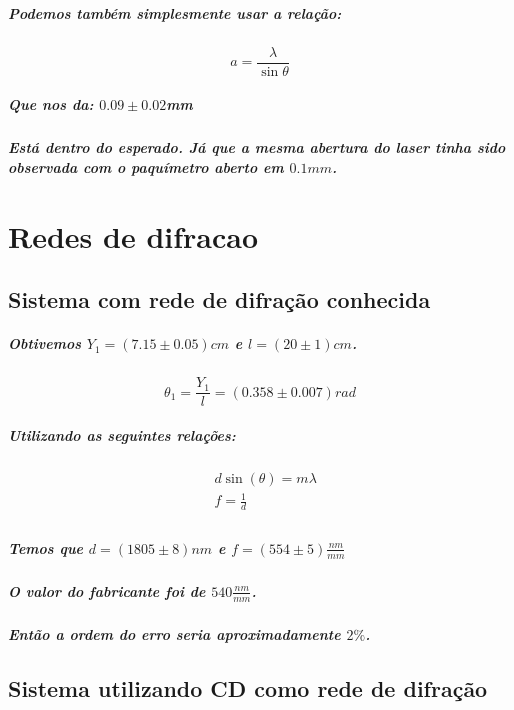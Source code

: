 \documentclass[12pt,twoside, a4paper, twocolumn]{article}
\begin{document}
\subparagraph*{Podemos também simplesmente usar a relação:}

\begin{equation}
  a = \frac{\lambda}{\sin{\theta}}
\end{equation}

\subparagraph*{Que nos da: $0.09 \pm 0.02$mm}

\subparagraph*{Está dentro do esperado. Já que a mesma abertura do laser tinha sido observada com o paquímetro aberto em $0.1mm$.}

\newpage

\pagebreak

\section{Redes de difracao}

\subsection{Sistema com rede de difração conhecida}

\subparagraph*{Obtivemos $Y_1 = (7.15 \pm 0.05)cm$ e $l = (20 \pm 1)cm$.}

\begin{equation}
  \theta_1 = \frac{Y_1}{l} = (0.358 \pm 0.007)rad
\end{equation}



\subparagraph*{Utilizando as seguintes relações:}

\begin{equation}
  \begin{aligned}
     & d \sin(\theta) = m \lambda \\
     & f = \frac{1}{d}            \\
  \end{aligned}
\end{equation}

\subparagraph*{Temos que $d = (1805 \pm 8) nm$ e $f = (554 \pm 5) \frac{nm}{mm}$ }

\subparagraph*{O valor do fabricante foi de  $540 \frac{nm}{mm}$.}

\subparagraph*{Então a ordem do erro seria aproximadamente $2\%$.}

\subsection{Sistema utilizando CD como rede de difração}
\end{document}
